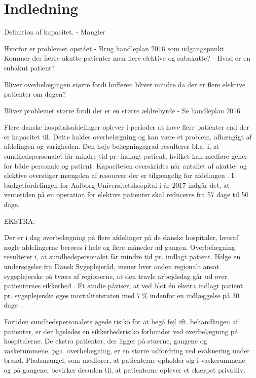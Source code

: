 \chapter{Indledning}

Definition af kapacitet. - Mangler

Hvorfor er problemet opstået - Brug handleplan 2016 som udgangspunkt. Kommer der færre akutte patienter men flere elektive og subakutte? - Hvad er en subakut patient?

Bliver overbelægingen større fordi bufferen bliver mindre da der er flere elektive patienter om dagen?

Bliver problemet større fordi der er en større ældrebyrde - Se handleplan 2016


Flere danske hospitalsafdelinger oplever i perioder at have flere patienter end der er kapacitet til. Dette kaldes overbelægning og kan være et problem, afhængigt af afdelingen og varigheden.\cite{SDS2015} Den høje belægningsgrad resulterer bl.a. i, at sundhedspersonalet får mindre tid pr. indlagt patient, hvilket kan medføre gener for både personale og patient.\cite{Kjeldsen2015} Kapaciteten overskrides når antallet af akutte- og elektive overstiger mængden af resourcer der er tilgængelig for afdelingen \cite{Company2013}. I budgetfordelingen for Aalborg Universitetshospital i år 2017 indgår det, at ventetiden på en operation for elektive patienter skal reduceres fra 57 dage til 50 dage. \cite{Budget2016} 






EKSTRA: 


Der er i dag overbelægning på flere afdelinger på de danske hospitaler, hvoraf nogle afdelingerne berøres i hele og flere måneder ad gangen. \cite{2015} Overbelægning resulterer i, at sundhedspersonalet får mindre tid pr. indlagt patient. Ifølge en undersøgelse fra Dansk Sygeplejeråd, mener hver anden regionalt ansat sygeplejerske på tværs af regionerne, at den travle arbejdsdag går ud over patienternes sikkerhed \cite{Kjeldsen2015}. Et studie påviser, at ved blot én ekstra indlagt patient pr. sygeplejerske øges mortalitetsraten med $7~\%$ indenfor en indlæggelse på 30 dage  \cite{Aiken2014}. 

Foruden sundhedspersonalets øgede risiko for at begå fejl ift. behandlingen af patienter, er der ligeledes en sikkerhedsrisiko forbundet ved overbelægning på hospitalerne. De ekstra patienter, der ligger på stuerne, gangene og vaskerummene, pga. overbelægning, er en større udfordring ved evakuering under brand. Pladsmangel, som medfører, at patienterne opholder sig i vaskerummene og på gangene, bevirker desuden til, at patienterne oplever et skærpet privatliv. \cite{Madsen2014}

